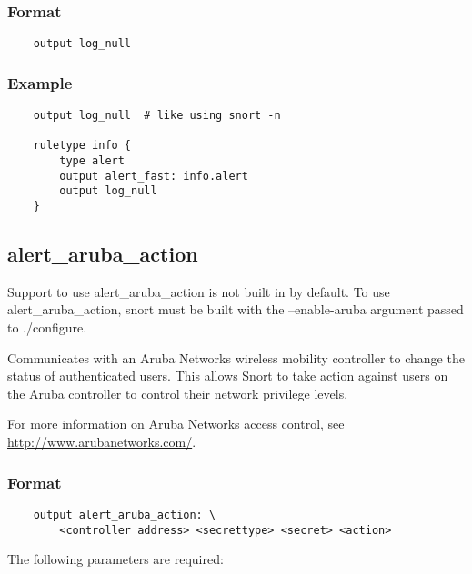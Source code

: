 \documentclass[english]{report}
\newenvironment{note}{
\samepage
    \vspace{10pt}{\textsf{
        {\hspace{7pt}\Huge{$\triangle$\hspace{-12.5pt}{\Large{$^!$}}}}\hspace{5pt}
        {\Large{NOTE}}
    }
    }
   \begin{center}
    \par\vspace{-17pt}

    \begin{lrbox}{\savepar}
    \begin{minipage}[r]{6in}
}
{
    \end{minipage}
    \end{lrbox}
    \fbox{
        \usebox{
            \savepar
	}
    }
    \par\vskip10pt
    \end{center}
}
\newenvironment{note}{
        \begin{rawhtml}
        <p><table border="1"><tr><td><b>
        Note:&nbsp;&nbsp;</b>
        \end{rawhtml}
}{
        \begin{rawhtml}
        </b></td></tr></table></p>
        \end{rawhtml}
}
\begin{document}
\subsubsection{Format}

\begin{verbatim}
    output log_null
\end{verbatim}

\subsubsection{Example}

\begin{verbatim}
    output log_null  # like using snort -n
    
    ruletype info {
        type alert
        output alert_fast: info.alert
        output log_null
    }
\end{verbatim}

\subsection{alert\_aruba\_action}

\begin{note}

Support to use alert\_aruba\_action is not built in by default.  To use
alert\_aruba\_action, snort must be built with the --enable-aruba argument
passed to ./configure.

\end{note}

Communicates with an Aruba Networks wireless mobility controller to change the
status of authenticated users.  This allows Snort to take action against users
on the Aruba controller to control their network privilege levels.

For more information on Aruba Networks access control, see
\url{http://www.arubanetworks.com/}.

\subsubsection{Format}

\begin{verbatim}
    output alert_aruba_action: \
        <controller address> <secrettype> <secret> <action>
\end{verbatim}

The following parameters are required:
\end{document}
